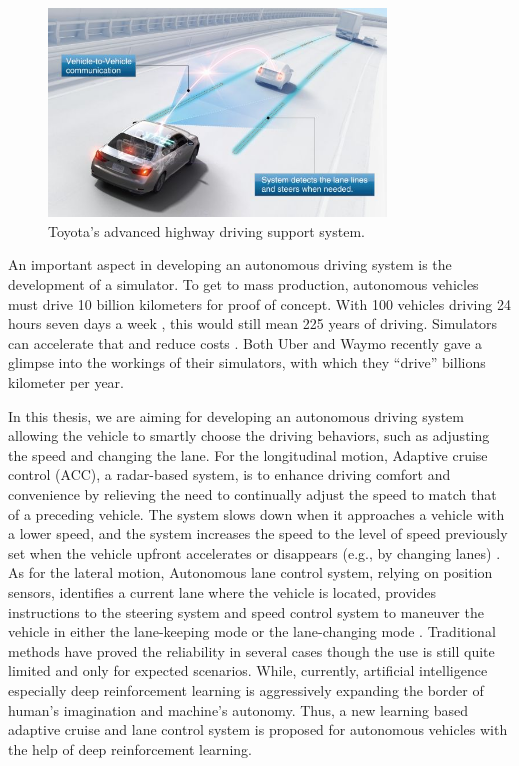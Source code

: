 \begin{figure}[h] 
\centering
\includegraphics[width=0.8\textwidth]{figs/ch1/highway-toyota}
\caption{Toyota's advanced highway driving support system.}
\label{fig:toyota}
\end{figure}

An important aspect in developing an autonomous driving system is the development of a simulator. To get to mass production, autonomous vehicles must drive 10 billion kilometers for proof of concept. With 100 vehicles driving 24 hours seven days a week , this would still mean 225 years of driving. Simulators can accelerate that and reduce costs \cite{Appolo2017}. Both Uber and Waymo recently gave a glimpse into the workings of their simulators, with which they ``drive'' billions kilometer per year.


In this thesis, we are aiming for developing an autonomous driving system allowing the vehicle to smartly choose the driving behaviors, such as adjusting the speed and changing the lane. For the longitudinal motion, Adaptive cruise control (ACC), a radar-based system, is to enhance driving comfort and convenience by relieving the need to continually adjust the speed to match that of a preceding vehicle. The system slows down when it approaches a vehicle with a lower speed, and the system increases the speed to the level of speed previously set when the vehicle upfront accelerates or disappears (e.g., by changing lanes) \cite{ACC2002}. As for the lateral motion, Autonomous lane control system, relying on position sensors, identifies a current lane where the vehicle is located, provides instructions to the steering system and speed control system to maneuver the vehicle in either the lane-keeping mode or the lane-changing mode \cite{LaneControl2012}. Traditional methods have proved the reliability in several cases though the use is still quite limited and only for expected scenarios. While, currently, artificial intelligence especially deep reinforcement learning is aggressively expanding the border of human's imagination and machine's autonomy. Thus, a new learning based adaptive cruise and lane control system is proposed for autonomous vehicles with the help of deep reinforcement learning.

